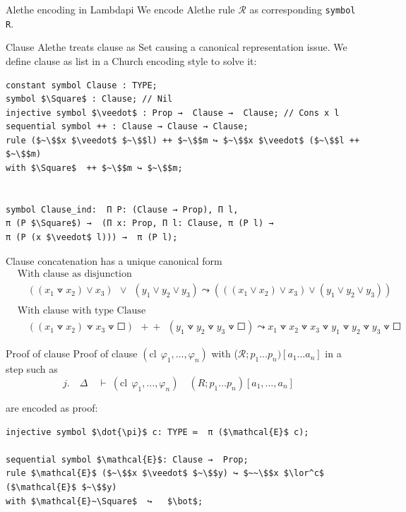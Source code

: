 \documentclass[aspectratio=169,xcolor={dvipsnames}]{beamer}
\begin{document}
\begin{frame}[t,fragile]{Alethe encoding in Lambdapi}
We encode Alethe rule $\mathcal{R}$ as corresponding \lstinline{symbol R}.
\begin{block}{Clause}
Alethe treats clause as Set causing a canonical representation issue. We define clause as list in a Church encoding style to solve it:

\begin{lstlisting}[mathescape=true]
constant symbol Clause : TYPE;
symbol $\Square$ : Clause; // Nil
injective symbol $\veedot$ : Prop →  Clause →  Clause; // Cons x l
sequential symbol ++ : Clause → Clause → Clause;
rule ($~\$$x $\veedot$ $~\$$l) ++ $~\$$m ↪ $~\$$x $\veedot$ ($~\$$l ++ $~\$$m)
with $\Square$  ++ $~\$$m ↪ $~\$$m;


symbol Clause_ind:  Π P: (Clause → Prop), Π l,
π (P $\Square$) →  (Π x: Prop, Π l: Clause, π (P l) →
π (P (x $\veedot$ l))) →  π (P l);
\end{lstlisting}
\end{block}
\end{frame}


\begin{frame}{Clause concatenation has a unique canonical form}
\begin{align*}
&\text{With clause as disjunction}\\
&\quad ((x_1 \veedot x_2) \lor x_3) ~~\lor~~ (y_1 \lor y_2 \lor y_3) \leadsto (((x_1 \lor x_2) \lor x_3) \lor (y_1 \lor y_2 \lor y_3))\\  
&\\
&\text{With clause with type Clause}\\
&\quad ((x_1 \veedot x_2) \veedot x_3 \veedot \Square) ~~+\!+~~ (y_1 \veedot y_2 \veedot y_3 \veedot \Square) \leadsto x_1 \veedot x_2 \veedot x_3 \veedot y_1 \veedot y_2 \veedot y_3 \veedot \Square
\end{align*}
\end{frame}

\begin{frame}[t,fragile]{Proof of clause}
Proof of clause $(\text{cl}~~\varphi_1, \dots ,\varphi_n)$ with ($\mathcal{R}; p_1 \dots p_n)[a_1 \dots a_n]$ in a step such as
\begin{equation*}
    j. \quad  \Delta \quad \vdash~ (\text{cl}~~\varphi_1, \dots ,\varphi_n) \quad (R; p_1 \dots p_n)[a_1, \dots, a_n]\quad
\end{equation*}

are encoded as proof:
\begin{lstlisting}[mathescape=true]
injective symbol $\dot{\pi}$ c: TYPE ≔  π ($\mathcal{E}$ c);

sequential symbol $\mathcal{E}$: Clause →  Prop;
rule $\mathcal{E}$ ($~\$$x $\veedot$ $~\$$y) ↪ $~~\$$x $\lor^c$ ($\mathcal{E}$ $~\$$y)
with $\mathcal{E}~\Square$  ↪   $\bot$;
\end{lstlisting}
\end{frame}
\end{document}

